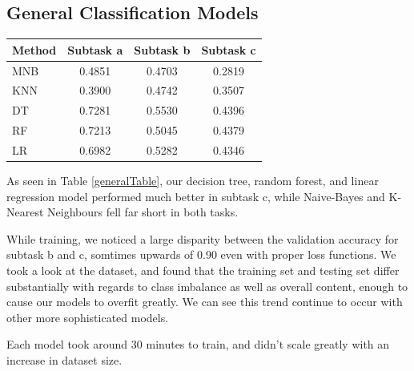 \documentclass[a4paper, 12pt]{article}
\begin{document}
\begin{multicols}{2}
    \subsection{General Classification Models}
        \begin{center}
            \begin{tabular}{l|ccc}
                Method & Subtask a & Subtask b & Subtask c \\
                \hline
                MNB & 0.4851 & 0.4703 & 0.2819 \\
                KNN & 0.3900 & 0.4742 & 0.3507 \\
                DT & 0.7281 & 0.5530 & 0.4396 \\
                RF & 0.7213 & 0.5045 & 0.4379 \\
                LR & 0.6982 & 0.5282 & 0.4346
            \end{tabular}       
            \label{generalTable}
        \end{center}

        As seen in Table \ref{generalTable}, our decision tree, random forest, and linear regression model performed much better in subtask c, while Naive-Bayes and K-Nearest Neighbours fell far short in both tasks. 
        
        While training, we noticed a large disparity between the validation accuracy for subtask b and c, somtimes upwards of 0.90 even with proper loss functions. We took a look at the dataset, and found that the training set and testing set differ substantially with regards to class imbalance as well as overall content, enough to cause our models to overfit greatly. We can see this trend continue to occur with other more sophisticated models.

        Each model took around 30 minutes to train, and didn't scale greatly with an increase in dataset size.


\end{multicols}
\end{document}
